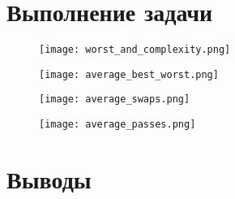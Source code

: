 \documentclass[12pt, a4paper]{report}
\begin{document}
	\section*{Выполнение задачи}

	\newpage
	\vfill

	\begin{figure}
		\texttt{[image: worst\_and\_complexity.png]}
	\end{figure}
	\begin{figure}
		\texttt{[image: average\_best\_worst.png]}
	\end{figure}
	\begin{figure}
		\texttt{[image: average\_swaps.png]}
	\end{figure}
	\begin{figure}
		\texttt{[image: average\_passes.png]}
	\end{figure}

	\vfill
	\clearpage
	
	\section*{Выводы}
\end{document}
